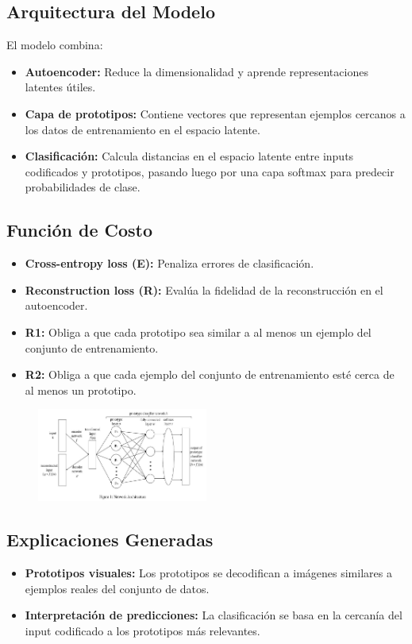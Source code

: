 \documentclass{report}
\begin{document}
    \subsection{Arquitectura del Modelo}
    El modelo combina:
    \begin{itemize}
        \item \textbf{Autoencoder:} Reduce la dimensionalidad y aprende representaciones latentes útiles.
        \item \textbf{Capa de prototipos:} Contiene vectores que representan ejemplos cercanos a los datos de entrenamiento en el espacio latente.
        \item \textbf{Clasificación:} Calcula distancias en el espacio latente entre inputs codificados y prototipos, pasando luego por una capa softmax para predecir probabilidades de clase.
    \end{itemize}

    \subsection{Función de Costo}
    \begin{itemize}
        \item \textbf{Cross-entropy loss (E):} Penaliza errores de clasificación.
        \item \textbf{Reconstruction loss (R):} Evalúa la fidelidad de la reconstrucción en el autoencoder.
        \item \textbf{R1:} Obliga a que cada prototipo sea similar a al menos un ejemplo del conjunto de entrenamiento.
        \item \textbf{R2:} Obliga a que cada ejemplo del conjunto de entrenamiento esté cerca de al menos un prototipo.
    \end{itemize}


    \begin{figure}[H] 
        \centering
        \includegraphics[width=0.5\textwidth]{Images/Li2017.jpg}
    \end{figure}


    \subsection{Explicaciones Generadas}
    \begin{itemize}
        \item \textbf{Prototipos visuales:} Los prototipos se decodifican a imágenes similares a ejemplos reales del conjunto de datos.
        \item \textbf{Interpretación de predicciones:} La clasificación se basa en la cercanía del input codificado a los prototipos más relevantes.
    \end{itemize}
\end{document}
